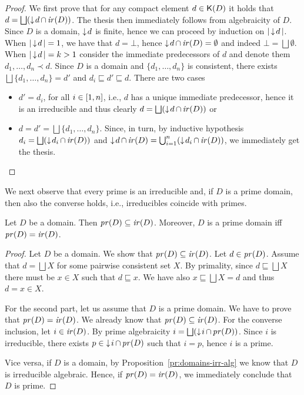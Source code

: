 \begin{proof}
  We first prove that for any compact element $d \in \mathop{\mathsf{K}({D})}$ it
  holds that $d = \bigsqcup (\mathop{\downarrow\!{d}} \cap \mathop{\mathit{ir}({D})})$. 
  The thesis then immediately follows from algebraicity of $D$. Since
  $D$ is a domain, $\mathop{\downarrow\!{d}}$ is finite, hence we can proceed by
  induction on $|\mathop{\downarrow\!{d}}|$. When $|\mathop{\downarrow\!{d}}| = 1$, we have
  that $d = \bot$, hence $\mathop{\downarrow\!{d}} \cap \mathop{\mathit{ir}({D})} = \emptyset$ and
  indeed $\bot = \bigsqcup \emptyset$. When $|\mathop{\downarrow\!{d}}| = k > 1$
  consider the immediate predecessors of $d$ and denote them
  $d_1, \ldots, d_n \prec d$. Since $D$ is a domain and
  $\{ d_1, \ldots, d_n \}$ is consistent, there exists
  $\bigsqcup \{ d_1, \ldots, d_n \} = d'$ and
  $d_i \sqsubseteq d' \sqsubseteq d$. There are two cases
  \begin{itemize}
  \item $d' = d_i$, for all $i \in [{1},{n}]$,
    i.e., $d$ has a unique immediate predecessor, hence it is an
    irreducible and thus clearly $d = \bigsqcup (\mathop{\downarrow\!{d}} \cap \mathop{\mathit{ir}({D})})$ or
  \item $d = d' = \bigsqcup \{ d_1, \ldots, d_n \}$. Since, in turn,
    by inductive hypothesis $d_i = \bigsqcup (\mathop{\downarrow\!{d_i}} \cap \mathop{\mathit{ir}({D})})$ 
    and $\mathop{\downarrow\!{d}} \cap \mathop{\mathit{ir}({D})}= \bigcup_{i=1}^n (\mathop{\downarrow\!{d_i}} \cap \mathop{\mathit{ir}({D})})$,
    we immediately get the thesis.
  \end{itemize}
\end{proof}


We next observe that every prime is an irreducible and, if $D$ is a
prime domain, then also the converse holds, i.e., irreducibles
coincide with primes.


\begin{proposition}
  \label{pr:irr-prime-alg}
  Let $D$ be a domain. Then $\mathop{\mathit{pr}({D})} \subseteq \mathop{\mathit{ir}({D})}$. Moreover, $D$ is a
  prime domain iff $\mathop{\mathit{pr}({D})} = \mathop{\mathit{ir}({D})}$.
\end{proposition}


\begin{proof}
  Let $D$ be a domain. We show that $\mathop{\mathit{pr}({D})} \subseteq \mathop{\mathit{ir}({D})}$. Let
  $d \in \mathop{\mathit{pr}({D})}$. Assume that $d = \bigsqcup X$ for some pairwise
  consistent set $X$. By primality, since $d \sqsubseteq \bigsqcup X$
  there must be $x \in X$ such that $d \sqsubseteq x$. We have also
  $x \sqsubseteq \bigsqcup X = d$ and thus $d=x \in X$.

    \medskip
    
    For the second part, let us assume that $D$ is a prime domain. We have to prove that $\mathop{\mathit{pr}({D})} = \mathop{\mathit{ir}({D})}$. We already know that $\mathop{\mathit{pr}({D})} \subseteq \mathop{\mathit{ir}({D})}$.
  For the converse inclusion, let $i \in \mathop{\mathit{ir}({D})}$. By
  prime algebraicity $i =\bigsqcup (\mathop{\downarrow\!{i}} \cap
  \mathop{\mathit{pr}({D})})$. Since $i$ is irreducible, there exists
  $p \in \mathop{\downarrow\!{i}} \cap \mathop{\mathit{pr}({D})}$ such that $i = p$, hence $i$ is
  a prime.

  Vice versa, if $D$ is a domain, by Proposition~\ref{pr:domains-irr-alg} we
  know that $D$ is irreducible algebraic. Hence, if $\mathop{\mathit{pr}({D})} = \mathop{\mathit{ir}({D})}$,
  we immediately conclude that $D$ is prime.
\end{proof}




